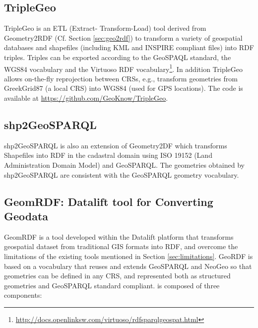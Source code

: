 \subsection{TripleGeo}
TripleGeo \cite{triplegeo2014} is an ETL (Extract- Transform-Load) tool derived from Geometry2RDF (Cf. Section \ref{sec:geo2rdf}) to transform a variety of geospatial databases and shapefiles (including KML and INSPIRE compliant files) into RDF triples. Triples can be exported according to the GeoSPAQL standard, the WGS84 vocabulary and the Virtuoso RDF vocabulary\footnote{\url{http://docs.openlinksw.com/virtuoso/rdfsparqlgeospat.html}}. In addition TripleGeo allows on-the-fly reprojection between CRSs, e.g., transform geometries from GreekGrid87 (a local CRS) into WGS84 (used for GPS locations). The code is available at \url{https://github.com/GeoKnow/TripleGeo}.

\subsection{shp2GeoSPARQL}
shp2GeoSPARQL \cite{saavedra14} is also an extension of Geometry2DF which transforms Shapefiles into RDF in the cadastral domain using ISO 19152 \cite{iso2012} (Land Administration Domain Model) and GeoSPARQL. The geometries obtained by shp2GeoSPARQL are consistent with the GeoSPARQL geometry vocabulary.


\subsection{GeomRDF: Datalift tool for Converting Geodata}
\label{sec:geomRDF}
GeomRDF \cite{hamdi14} is a tool developed within the Datalift platform that transforms geospatial dataset from traditional GIS formats into RDF, and overcome the limitations of the existing tools mentioned in Section \ref{sec:limitations}. GeoRDF is based on a vocabulary that reuses and extends GeoSPARQL and NeoGeo so that geometries can be defined in any CRS, and represented both as structured geometries and GeoSPARQL standard compliant. \geom is composed of three components:

